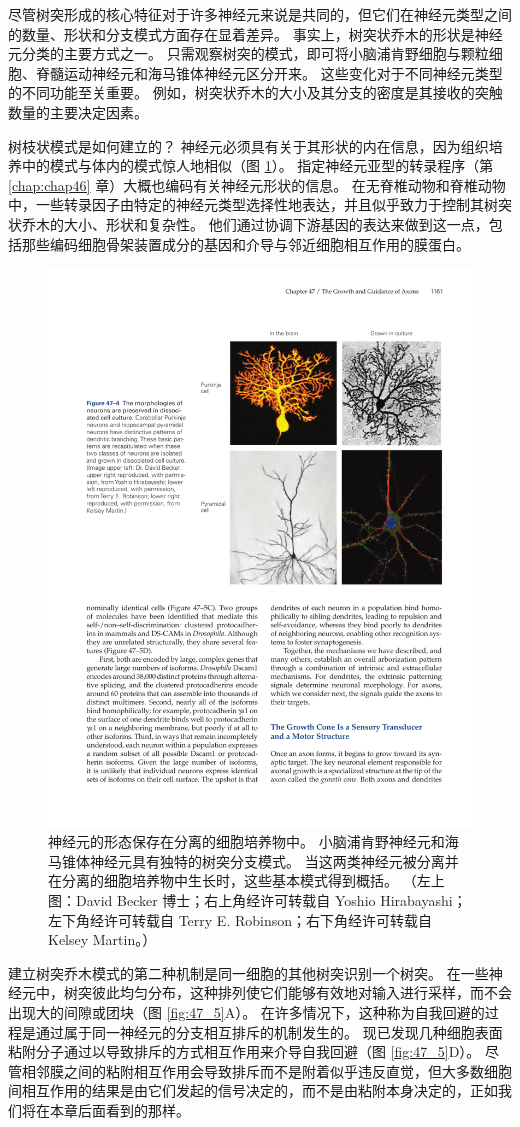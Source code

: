 尽管树突形成的核心特征对于许多神经元来说是共同的，但它们在神经元类型之间的数量、形状和分支模式方面存在显着差异。 事实上，树突状乔木的形状是神经元分类的主要方式之一。 只需观察树突的模式，即可将小脑浦肯野细胞与颗粒细胞、脊髓运动神经元和海马锥体神经元区分开来。 这些变化对于不同神经元类型的不同功能至关重要。 例如，树突状乔木的大小及其分支的密度是其接收的突触数量的主要决定因素。

树枝状模式是如何建立的？ 神经元必须具有关于其形状的内在信息，因为组织培养中的模式与体内的模式惊人地相似（图 \ref{fig:47_4}）。 
指定神经元亚型的转录程序（第 \ref{chap:chap46} 章）大概也编码有关神经元形状的信息。 在无脊椎动物和脊椎动物中，一些转录因子由特定的神经元类型选择性地表达，并且似乎致力于控制其树突状乔木的大小、形状和复杂性。 他们通过协调下游基因的表达来做到这一点，包括那些编码细胞骨架装置成分的基因和介导与邻近细胞相互作用的膜蛋白。

\begin{figure}[htbp]
	\centering
	\includegraphics[width=0.7\linewidth]{chap47/fig_47_4}
	\caption{神经元的形态保存在分离的细胞培养物中。 小脑浦肯野神经元和海马锥体神经元具有独特的树突分支模式。 当这两类神经元被分离并在分离的细胞培养物中生长时，这些基本模式得到概括。 （左上图：David Becker 博士；右上角经许可转载自 Yoshio Hirabayashi；左下角经许可转载自 Terry E. Robinson；右下角经许可转载自 Kelsey Martin。）}
	\label{fig:47_4}
\end{figure}

建立树突乔木模式的第二种机制是同一细胞的其他树突识别一个树突。 在一些神经元中，树突彼此均匀分布，这种排列使它们能够有效地对输入进行采样，而不会出现大的间隙或团块（图 \ref{fig:47_5}A）。 在许多情况下，这种称为自我回避的过程是通过属于同一神经元的分支相互排斥的机制发生的。 现已发现几种细胞表面粘附分子通过以导致排斥的方式相互作用来介导自我回避（图 \ref{fig:47_5}D）。 尽管相邻膜之间的粘附相互作用会导致排斥而不是附着似乎违反直觉，但大多数细胞间相互作用的结果是由它们发起的信号决定的，而不是由粘附本身决定的，正如我们将在本章后面看到的那样。

